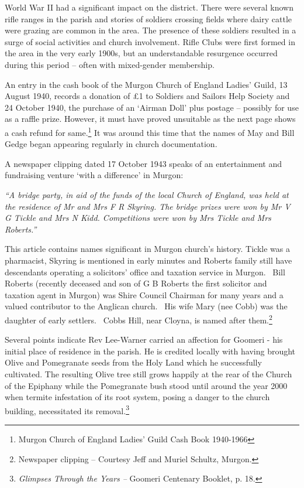 World War II had a significant impact on the district. There were several known rifle ranges in the parish and stories of soldiers crossing fields where dairy cattle were grazing are common in the area. The presence of these soldiers resulted in a surge of social activities and church involvement. Rifle Clubs were first formed in the area in the very early 1900s, but an understandable resurgence occurred during this period -- often with mixed-gender membership.



An entry in the cash book of the Murgon Church of England Ladies' Guild, 13 August 1940, records a donation of \pounds1 to Soldiers and Sailors Help Society and 24 October 1940, the purchase of an `Airman Doll' plus postage -- possibly for use as a raffle prize. However, it must have proved unsuitable as the next page shows a cash refund for same.\footnote{Murgon Church of England Ladies' Guild Cash Book 1940-1966} It was around this time that the names of May and Bill Gedge began appearing regularly in church documentation.


A newspaper clipping dated 17 October 1943 speaks of an entertainment and fundraising venture `with a difference' in Murgon:



\emph{``A bridge party, in aid of the funds of the local Church of England, was held at the residence of Mr and Mrs F R Skyring. The bridge prizes were won by Mr V G Tickle and Mrs N Kidd. Competitions were won by Mrs Tickle and Mrs Roberts.''}



\smallskip


This article contains names significant in Murgon church's history. Tickle was a pharmacist, Skyring is mentioned in early minutes and Roberts family still have descendants operating a solicitors' office and taxation service in Murgon.~ Bill Roberts (recently deceased and son of G B Roberts the first solicitor and taxation agent in Murgon) was Shire Council Chairman for many years and a valued contributor to the Anglican church.~ His wife Mary (nee Cobb) was the daughter of early settlers.~ Cobbs Hill, near Cloyna, is named after them.\footnote{Newspaper clipping -- Courtesy Jeff and Muriel Schultz, Murgon.}


Several points indicate Rev Lee-Warner carried an affection for Goomeri - his initial place of residence in the parish. He is credited locally with having brought Olive and Pomegranate seeds from the Holy Land which he successfully cultivated. The resulting Olive tree still grows happily at the rear of the Church of the Epiphany while the Pomegranate bush stood until around the year 2000 when termite infestation of its root system, posing a danger to the church building, necessitated its removal.\footnote{\emph{Glimpses Through the Years --} Goomeri Centenary Booklet, p. 18.}


